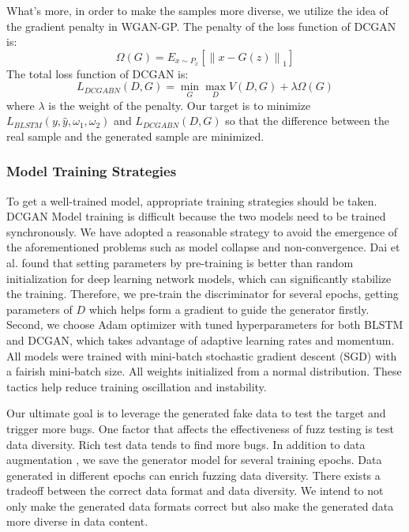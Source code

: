 What's more, in order to make the samples more diverse, we utilize the idea of the gradient penalty in WGAN-GP. The penalty of the loss function of DCGAN is:
\begin{equation}
\Omega (G) = {E_{x\sim{P_x}}}\left[ {{{\left\| {x - G(z)} \right\|}_1}} \right]
\end{equation}
The total loss function of DCGAN is: 
\begin{equation}
{L_{DCGABN}}(D,G) = {\min _G}{\max _D}V(D,G) + \lambda \Omega (G)
\end{equation}
where $\lambda$ is the weight of the penalty. Our target is to minimize  ${L_{BLSTM}}(y,\hat y,{\omega _1},{\omega _2})$ and ${L_{DCGABN}}(D,G)$ so that the difference between the real sample and the generated sample are minimized.

\subsubsection{Model Training Strategies}
To get a well-trained model, appropriate training strategies should be taken. DCGAN Model training is difficult because the two models need to be trained synchronously. We have adopted a reasonable strategy to avoid the emergence of the aforementioned problems such as model collapse and non-convergence. Dai et al. \cite{dai2015semi} found that setting parameters by pre-training is better than random initialization for deep learning network models, which can significantly stabilize the training. Therefore, we pre-train the discriminator for several epochs, getting parameters of $D$ which helps form a gradient to guide the generator firstly. Second, we choose Adam optimizer \cite{kingma2014adam} with tuned hyperparameters for both BLSTM and DCGAN, which takes advantage of adaptive learning rates and momentum. All models were trained with mini-batch stochastic gradient descent (SGD) \cite{sutskever2013importance} with a fairish mini-batch size. All weights initialized from a normal distribution. These tactics help reduce training oscillation and instability.

Our ultimate goal is to leverage the generated fake data to test the target and trigger more bugs. One factor that affects the effectiveness of fuzz testing is test data diversity. Rich test data tends to find more bugs. In addition to data augmentation \cite{salamon2017deep}, we save the generator model for several training epochs. Data generated in different epochs can enrich fuzzing data diversity. There exists a tradeoff between the correct data format and data diversity. We intend to not only make the generated data formats correct but also make the generated data more diverse in data content.

